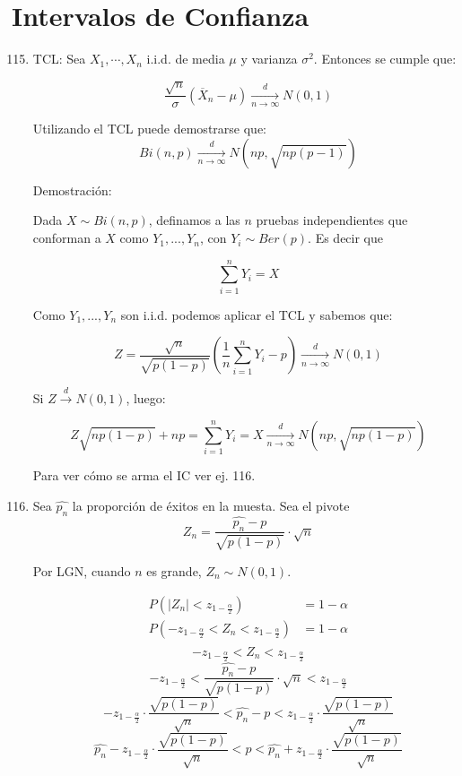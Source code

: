 \section{Intervalos de Confianza}
\begin{enumerate}
	\setcounter{enumi}{114}
	\item
		TCL: Sea $X_1, \cdots, X_n$ i.i.d. de media $\mu$ y varianza $\sigma^2$. Entonces se cumple que:

		$$\frac{\sqrt{n}}{\sigma}(\overline X_n - \mu)\xrightarrow[n\rightarrow\infty]{d} N(0,1)$$

		Utilizando el TCL puede demostrarse que:
		$$Bi(n,p)\xrightarrow[n\rightarrow\infty]{d} N(np,\sqrt{np(p-1)})$$

		Demostración:

		Dada $X\sim Bi(n,p)$, definamos a las $n$ pruebas independientes que conforman a $X$ como $Y_1, ... , Y_n$, con $Y_i \sim Ber(p)$. Es decir que

		$$\sum_{i=1}^{n}Y_i = X$$

		Como $Y_1, ... , Y_n$ son i.i.d. podemos aplicar el TCL y sabemos que:

		$$Z = \frac{\sqrt{n}}{\sqrt{p(1-p)}}(\frac{1}{n}\sum_{i=1}^{n}Y_i - p)\xrightarrow[n\rightarrow\infty]{d} N(0,1)$$

		Si $Z \xrightarrow{d} N(0,1)$, luego:

		$$Z\sqrt{np(1-p)}+np = \sum_{i=1}^{n}Y_i = X \xrightarrow[n\rightarrow\infty]{d} N(np,\sqrt{np(1-p)})$$

		Para ver cómo se arma el IC ver ej. 116.

	\item
		Sea $\hat{p_n}$ la proporción de éxitos en la muesta.
		Sea el pivote $$Z_n = \frac{\hat{p_n} - p}{\sqrt{p(1-p)}}\cdot \sqrt{n}$$

		Por LGN, cuando $n$ es grande, $Z_n\sim N(0,1)$.

		\begin{align*}
			P(|Z_n| < z_{1-\frac{\alpha}{2}})							& = 1-\alpha	\\
			P(-z_{1-\frac{\alpha}{2}} < Z_n < z_{1-\frac{\alpha}{2}})	& = 1-\alpha	\\
		\end{align*}
		$$-z_{1-\frac{\alpha}{2}} < Z_n < z_{1-\frac{\alpha}{2}}$$
		$$-z_{1-\frac{\alpha}{2}} <  \frac{\hat{p_n} - p}{\sqrt{p(1-p)}}\cdot \sqrt{n} < z_{1-\frac{\alpha}{2}}$$
		$$-z_{1-\frac{\alpha}{2}}\cdot \frac{\sqrt{p(1-p)}}{\sqrt{n}} <  \hat{p_n} - p < z_{1-\frac{\alpha}{2}}\cdot \frac{\sqrt{p(1-p)}}{\sqrt{n}}$$
		$$\hat{p_n} - z_{1-\frac{\alpha}{2}}\cdot \frac{\sqrt{p(1-p)}}{\sqrt{n}} < p < \hat{p_n} + z_{1-\frac{\alpha}{2}}\cdot \frac{\sqrt{p(1-p)}}{\sqrt{n}}$$


\end{enumerate}
